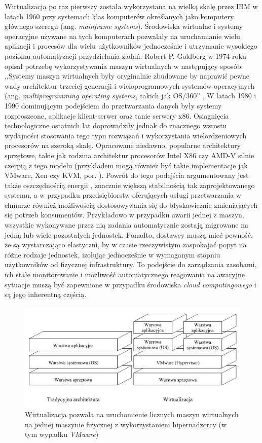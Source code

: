 \documentclass[12pt,a4paper,twoside]{article}
\begin{document}
Wirtualizacja po raz pierwszy została wykorzystana na wielką skalę przez IBM w latach 1960 przy systemach klas komputerów określanych jako komputery głównego szeregu (ang. \textit{mainframe systems}). Środowiska wirtualne i systemy operacyjne używane na tych komputerach pozwalały na uruchamianie wielu aplikacji i procesów dla wielu użytkowników jednocześnie i utrzymanie wysokiego poziomu automatyzacji przydzielania zadań. Robert P. Goldberg w 1974 roku opisał potrzebę wykorzystywania maszyn wirtualnych w następujący sposób: ,,Systemy maszyn wirtualnych były oryginalnie zbudowane by naprawić pewne wady architektur trzeciej generacji i wieloprogramowych systemów operacyjnych (ang. \textit{multiprogramming operating systems}, takich jak OS/360'' \citep{goldberg1974}. W latach 1980 i 1990 dominującym podejściem do przetwarzania danych były systemy rozproszeone, aplikacje klient-serwer oraz tanie serwery x86. Osiagnięcia technologiczne ostatnich lat doprowadziły jednak do znacznego wzrostu wydajności stosowania tego typu rozwiązań i wykorzystania wielordzeniowych procesorów na szeroką skalę. Opracowane niedawno, popularne architektury sprzętowe, takie jak rodzina architektur procesorów Intel X86 czy AMD-V silnie czerpią z tego modelu (przykładem mogą również być takie implementacje jak VMware, Xen czy KVM, por. \citet{shroff2010}). Powrót do tego podejścia argumentowany jest także oszczędnością energii \citep{ward2013}, znacznie większą stabilnością tak zaprojektowanego systemu, a w przypadku przedsiębiorstw oferujących usługi przetwarzania w chmurze również możliwością dostosowywania się do błyskawicznie zmieniających się potrzeb konsumentów. Przykładowo w przypadku awarii jednej z maszyn, wszystkie wykonywane przez nią zadania automatycznie zostają migrowane na jedną lub wiele pozostałych jednostek. Ponadto, dostawcy muszą mieć pewność, że są wystarczająco elastyczni, by w czasie rzeczywistym zaspokajać popyt na różne rodzaje jednostek, izolując jednocześnie w wymaganym stopniu użytkowników od fizycznej infrastruktury. To podejście do zarządzania zasobami, ich stałe monitorowanie i możliwość automatycznego reagowania na awaryjne sytuacje muszą być zapewnione w przypadku środowiska \textit{cloud computingowego} i są jego inherentną częścią.

\begin{figure}[h]
  \centering
\includegraphics[scale=0.8]{../obrazy/fig:vm.png}
\caption{Wirtualizacja pozwala na uruchomienie licznych maszyn wirtualnych na jednej maszynie fizycznej z wykorzystaniem hipernadzorcy (w tym wypadku \textit{VMware}) \label{fig:vm}}
\end{figure}
\end{document}
